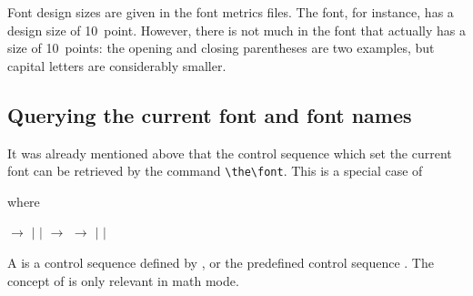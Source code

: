 \documentclass{book}
\begin{document}
Font design sizes are given in the font metrics files.
The  font, for instance, has a design size
of 10~point. However, there is not much in the font
that actually has a size of 10~points: the opening and closing
parentheses are two examples, but capital
letters are considerably smaller.

\subsection{Querying the current font and font names}

It was already mentioned above that the control sequence
which set the current font can be retrieved by the
command \verb>\the\font>. This is a special case of
\begin{Disp}\end{Disp} where
\begin{disp} $\longrightarrow$
 $|$  $|$ \nl
{} $\longrightarrow$
\nl
{} $\longrightarrow$
 $|$  $|$ \end{disp}
A  is a control sequence defined by ,
or the predefined control sequence .
The concept of  is only
relevant in math mode.
\end{document}
